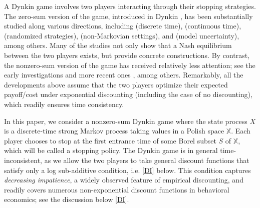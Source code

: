 \documentclass[11pt,reqno]{article}
\numberwithin{equation}{section}
\newcommand{\X}{\mathbb{X}}
\begin{document}
A Dynkin game involves two players interacting through their stopping strategies. %
The zero-sum version of the game, introduced in Dynkin \cite{Dynkin69}, has been substantially studied along various directions, including \cite{Dynkin69, Neveu-book-75} (discrete time), \cite{Bismut77, LM84, Morimoto84} (continuous time), \cite{Yasuda85, RSV01, TV02} (randomized strategies), \cite{CK96} (non-Markovian settings), and \cite{BY17} (model uncertainty), among others. Many of the studies not only show that a Nash equilibrium between the two players exists, but provide concrete constructions. By contrast, the nonzero-sum version of the game has received relatively less attention; see the early investigations \cite{Morimoto86, Ohtsubo87, Nagai87} and more recent ones \cite{HZ09, LS13, DFM18}, among others. Remarkably, all the developments above assume that the two players optimize their expected payoff/cost under exponential discounting (including the case of no discounting), which readily ensures time consistency. 

In this paper, we consider a nonzero-sum Dynkin game where the state process $X$ is a discrete-time strong Markov process taking values in a Polish space $\X$. Each player chooses to stop at the first entrance time of some Borel subset $S$ of $\X$, which will be called a stopping policy. The Dynkin game is in general time-inconsistent, as we allow the two players to take general discount functions that satisfy only a log sub-additive condition, i.e. \eqref{DI} below. This condition captures {\it decreasing impatience}, a widely observed feature of empirical discounting, and readily covers numerous non-exponential discount functions in behavioral economics; see the discussion below \eqref{DI}. 
\end{document}
